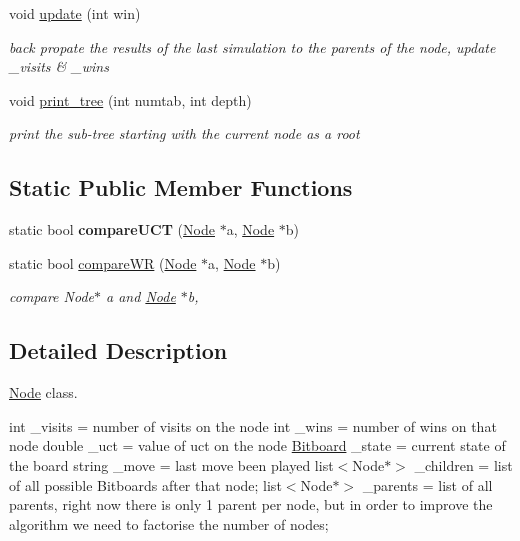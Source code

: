 \begin{DoxyCompactItemize}
void \hyperlink{classmcts_1_1_node_ad15ddfec38ddb675920017670dbd92ee}{update} (int win)
\begin{DoxyCompactList}\small\item\em back propate the results of the last simulation to the parents of the node, update \+\_\+visits \& \+\_\+wins \end{DoxyCompactList}\item 
void \hyperlink{classmcts_1_1_node_a7a4c678e7229510df95df9b85b8bdee7}{print\+\_\+tree} (int numtab, int depth)
\begin{DoxyCompactList}\small\item\em print the sub-\/tree starting with the current node as a root \end{DoxyCompactList}\end{DoxyCompactItemize}
\subsection*{Static Public Member Functions}
\begin{DoxyCompactItemize}
\item 
\hypertarget{classmcts_1_1_node_ac02a20d5b1bfe6eae84e70ae21fc61a0}{static bool {\bfseries compare\+U\+C\+T} (\hyperlink{classmcts_1_1_node}{Node} $\ast$a, \hyperlink{classmcts_1_1_node}{Node} $\ast$b)}\label{classmcts_1_1_node_ac02a20d5b1bfe6eae84e70ae21fc61a0}

\item 
static bool \hyperlink{classmcts_1_1_node_a6208d3fe6945797ed60c23c96ad35e97}{compare\+W\+R} (\hyperlink{classmcts_1_1_node}{Node} $\ast$a, \hyperlink{classmcts_1_1_node}{Node} $\ast$b)
\begin{DoxyCompactList}\small\item\em compare Node$\ast$ a and \hyperlink{classmcts_1_1_node}{Node} $\ast$b, \end{DoxyCompactList}\end{DoxyCompactItemize}


\subsection{Detailed Description}
\hyperlink{classmcts_1_1_node}{Node} class. 

int \+\_\+visits = number of visits on the node int \+\_\+wins = number of wins on that node double \+\_\+uct = value of uct on the node \hyperlink{class_bitboard}{Bitboard} \+\_\+state = current state of the board string \+\_\+move = last move been played list$<$\+Node$\ast$$>$ \+\_\+children = list of all possible Bitboards after that node; list$<$\+Node$\ast$$>$ \+\_\+parents = list of all parents, right now there is only 1 parent per node, but in order to improve the algorithm we need to factorise the number of nodes; 

